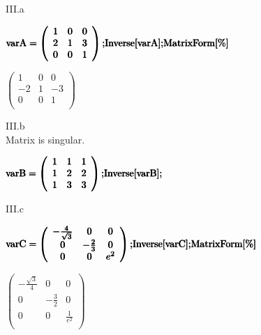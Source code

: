 \documentclass{article}
\begin{document}
III.a

\begin{doublespace}
\noindent\(\pmb{\text{varA}=\left(
\begin{array}{ccc}
 1 & 0 & 0 \\
 2 & 1 & 3 \\
 0 & 0 & 1 \\
\end{array}
\right);}\\
\pmb{\text{Inverse}[\text{varA}];}\\
\pmb{\text{MatrixForm}[\%]}\)
\end{doublespace}

\begin{doublespace}
\noindent\(\left(
\begin{array}{ccc}
 1 & 0 & 0 \\
 -2 & 1 & -3 \\
 0 & 0 & 1 \\
\end{array}
\right)\)
\end{doublespace}

III.b\\
Matrix is singular.

\begin{doublespace}
\noindent\(\pmb{\text{varB}=\left(
\begin{array}{ccc}
 1 & 1 & 1 \\
 1 & 2 & 2 \\
 1 & 3 & 3 \\
\end{array}
\right);}\\
\pmb{\text{Inverse}[\text{varB}];}\)
\end{doublespace}

III.c

\begin{doublespace}
\noindent\(\pmb{\text{varC}=\left(
\begin{array}{ccc}
 -\frac{4}{\sqrt{3}} & 0 & 0 \\
 0 & -\frac{2}{3} & 0 \\
 0 & 0 & e^2 \\
\end{array}
\right);}\\
\pmb{\text{Inverse}[\text{varC}];}\\
\pmb{\text{MatrixForm}[\%]}\)
\end{doublespace}

\begin{doublespace}
\noindent\(\left(
\begin{array}{ccc}
 -\frac{\sqrt{3}}{4} & 0 & 0 \\
 0 & -\frac{3}{2} & 0 \\
 0 & 0 & \frac{1}{e^2} \\
\end{array}
\right)\)
\end{doublespace}
\end{document}
